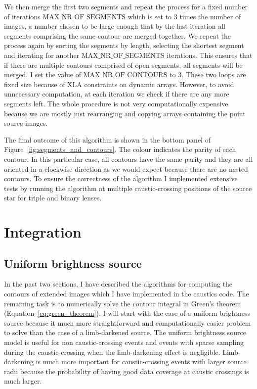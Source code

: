 \documentclass[12pt,dvipsnames]{report}
\newcommand{\ssf}[1]{\textsf{#1}}
\begin{document}
We then merge the first two segments and repeat the process for a fixed number of iterations 
$\text{MAX\_NR\_OF\_SEGMENTS}$ which is set to 3 times the number of images, a number 
chosen to be large enough that by the last iteration all segments comprising the same contour 
are merged together. 
We repeat the process again by sorting the segments by length, selecting the shortest 
segment and iterating for another $\text{MAX\_NR\_OF\_SEGMENTS}$ iterations. This ensures that
if there are multiple contours comprised of open segments, all segments will be merged. 
I set the value of $\text{MAX\_NR\_OF\_CONTOURS}$ to 3.
These two loops are fixed size because of \ssf{XLA} constraints on dynamic arrays. However, to avoid unnecessary computation,
at each iteration we check if there are any more segments left. 
The whole procedure is not very 
computationally expensive because we are mostly just rearranging and copying arrays containing
the point source images.

The final outcome of this algorithm is shown in the bottom panel of 
Figure~\ref{fig:segments_and_contours}. The colour indicates the parity of each contour. 
In this  particular
case, all contours have the same parity and they are all oriented in a clockwise direction
as we would expect because there are no nested contours. To ensure the correctness of 
the algorithm I implemented extensive tests by running the algorithm at multiple caustic-crossing 
positions of the source star for triple and binary lenses. 

\section{Integration}
\label{sec:caustics_integration}
\subsection{Uniform brightness source}
\label{ssec:mag_uniform}
In the past two sections, I have described the algorithms for computing the contours of extended
images which I have implemented in the \ssf{caustics} code. The remaining task is to numerically 
solve the contour integral in Green's theorem (Equation~\ref{eq:green_theorem}). I will start 
with the case of a uniform brightness source because it much more straightforward and 
computationally easier problem to solve than the case of a limb-darkened source.
The uniform brightness source model is useful for non caustic-crossing events and events 
with sparse sampling during the caustic-crossing when the limb-darkening effect is negligible.
Limb-darkening is much more important for 
caustic-crossing events with larger source radii because the probability of having good data coverage at caustic
crossings is much larger. 
\end{document}
